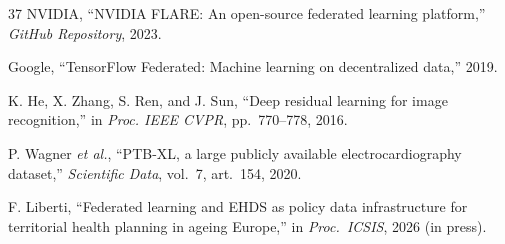 \documentclass[conference]{IEEEtran}
\begin{document}
\begin{thebibliography}{37}
NVIDIA, ``NVIDIA FLARE: An open-source federated learning platform,'' \textit{GitHub Repository}, 2023.

Google, ``TensorFlow Federated: Machine learning on decentralized data,'' 2019.

K. He, X. Zhang, S. Ren, and J. Sun, ``Deep residual learning for image recognition,'' in \textit{Proc. IEEE CVPR}, pp.~770--778, 2016.

P. Wagner \textit{et al.}, ``PTB-XL, a large publicly available electrocardiography dataset,'' \textit{Scientific Data}, vol.~7, art.~154, 2020.

F. Liberti, ``Federated learning and EHDS as policy data infrastructure for territorial health planning in ageing Europe,'' in \textit{Proc.\ ICSIS}, 2026 (in press).

\end{thebibliography}
\end{document}
